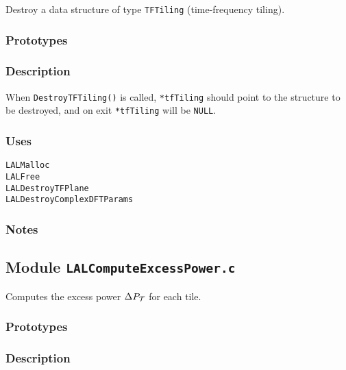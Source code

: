 Destroy a data structure of type \verb+TFTiling+ (time-frequency tiling).

\subsubsection*{Prototypes}
\vspace{0.1in}


\subsubsection*{Description}

When \verb+DestroyTFTiling()+ is called, \verb+*tfTiling+ should point to the
structure to be destroyed, and on exit \verb+*tfTiling+ will be \verb+NULL+.

\subsubsection*{Uses}
\begin{verbatim}
LALMalloc
LALFree
LALDestroyTFPlane
LALDestroyComplexDFTParams
\end{verbatim}
\subsubsection*{Notes}

\vfill{\footnotesize}

\newpage
\subsection{Module \texttt{LALComputeExcessPower.c}}
\label{ss:LALComputeExcessPower.c}

Computes the excess power $\Delta P_{\cal T}$ for each tile.

\subsubsection*{Prototypes}
\vspace{0.1in}


\subsubsection*{Description}

